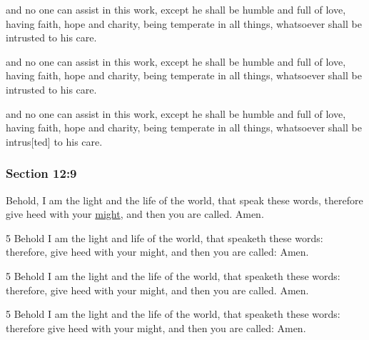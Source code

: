 		\begin{framed}
		\scriptsize
			\begin{compactdesc}
				\item[JSP] and no one can assist in this work, except he shall be humble and full of love, having faith, hope and charity, being temperate in all things, whatsoever shall be intrusted to his care.
				\item[DC 1835] and no one can assist in this work, except he shall be humble and full of love, having faith, hope and charity, being temperate in all things, whatsoever shall be intrusted to his care.
				\item[DC 1844] and no one can assist in this work, except he shall be humble and full of love, having faith, hope and charity, being temperate in all things, whatsoever shall be intrus[ted] to his care.
			\end{compactdesc}
		\end{framed}

	\subsubsection{Section 12:9} %
		\label{DC12-9}

		Behold, I am the light and the life of the world, that speak these words, therefore give heed with your \hyperref[MIGHT]{might}, and then you are called. Amen.

		\begin{framed}
		\scriptsize
			\begin{compactdesc}
				\item[JSP] 5 Behold I am the light and life of the world, that speaketh these words: therefore, give heed with your might, and then you are called: Amen.
				\item[DC 1835] 5 Behold I am the light and the life of the world, that speaketh these words: therefore, give heed with your might, and then you are called. Amen.
				\item[DC 1844] 5 Behold I am the light and the life of the world, that speaketh these words: therefore give heed with your might, and then you are called: Amen.
			\end{compactdesc}
		\end{framed}